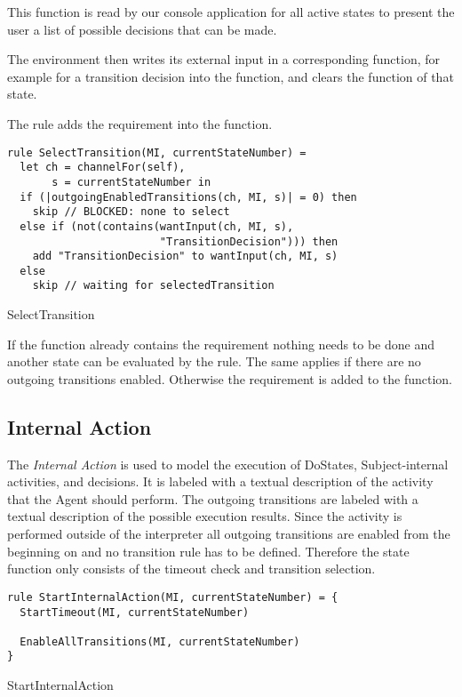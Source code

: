 This function is read by our console application for all active states to present the user a list of possible decisions that can be made.

The environment then writes its external input in a corresponding function, for example for a transition decision into the  function, and clears the  function of that state.

The  rule adds the  requirement into the  function.


\begin{listing}[htbp]
\begin{verbatim}
rule SelectTransition(MI, currentStateNumber) =
  let ch = channelFor(self),
       s = currentStateNumber in
  if (|outgoingEnabledTransitions(ch, MI, s)| = 0) then
    skip // BLOCKED: none to select
  else if (not(contains(wantInput(ch, MI, s),
                        "TransitionDecision"))) then
    add "TransitionDecision" to wantInput(ch, MI, s)
  else
    skip // waiting for selectedTransition
\end{verbatim}
\caption{SelectTransition}
\label{lst:shortasm:SelectTransition}
\end{listing}


If the  function already contains the
 requirement nothing needs to be done and another state can be evaluated by the  rule. The same applies if there are no outgoing transitions enabled. Otherwise the requirement is added to the  function.


\subsection{Internal Action}


The \emph{Internal Action} is used to model the execution of DoStates, Subject-internal activities, and decisions. It is labeled with a textual description of the activity that the Agent should perform. The outgoing transitions are labeled with a textual description of the possible execution results.
Since the activity is performed outside of the interpreter all outgoing transitions are enabled from the beginning on and no transition rule has to be defined. Therefore the state function only consists of the timeout check and transition selection.


\begin{listing}[htbp]
\begin{verbatim}
rule StartInternalAction(MI, currentStateNumber) = {
  StartTimeout(MI, currentStateNumber)

  EnableAllTransitions(MI, currentStateNumber)
}
\end{verbatim}
\caption{StartInternalAction}
\label{lst:shortasm:StartInternalAction}
\end{listing}


